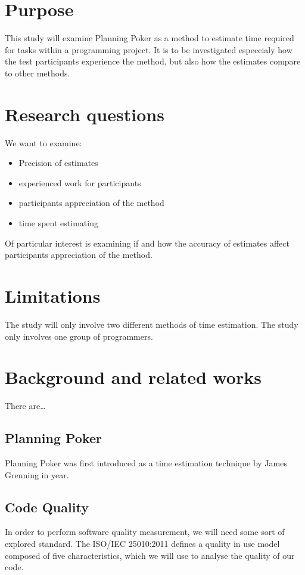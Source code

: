 \documentclass{sigchi}
\begin{document}
\section{Purpose}

This study will examine Planning Poker as a method to estimate time required for tasks within a programming project. It is to be investigated especcialy how the test participants experience the method, but also how the estimates compare to other methods.

\section{Research questions}
We want to examine:
\begin{itemize}
		\item Precision of estimates
		\item experienced work for participants
		\item participants appreciation of the method
		\item time spent estimating
\end{itemize}
Of particular interest is examining if and how the accuracy of estimates affect participants appreciation of the method.

\section{Limitations}
The study will only involve two different methods of time estimation.
The study only involves one group of programmers.

\section{Background and related works}
There are…

\subsection{Planning Poker}
Planning Poker was first introduced as a time estimation technique by James Grenning in year.\cite{grenning2002planning}

\subsection{Code Quality}
In order to perform software quality measurement, we will need some sort of explored standard. The ISO/IEC 25010:2011 defines a quality in use model composed of five characteristics,\cite{iso250102011} which we will use to analyse the quality of our code.
\end{document}
